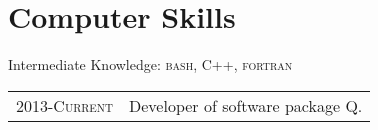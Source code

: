 \documentclass[a4paper,10pt]{article} %
\begin{document}

\section{Computer Skills}

Intermediate Knowledge: \textsc{bash}, \textsc{C++}, \textsc{fortran}\\
\begin{tabular}{r|p{11cm}}
\textsc{2013-Current} & Developer of software package Q. \\
\end{tabular}





\end{document}
